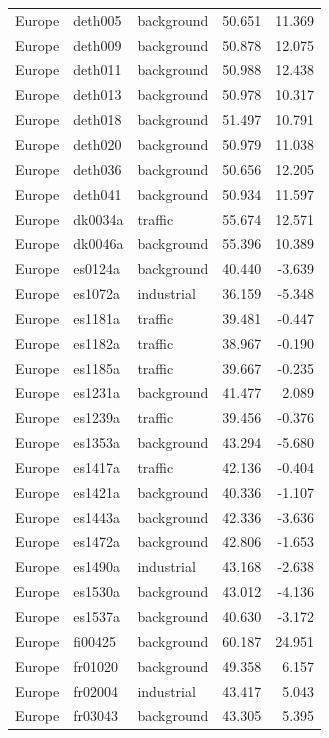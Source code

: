 \documentclass{article}
\begin{document}
\begin{longtable}{lllrr}
Europe & deth005 & background & 50.651 & 11.369 \\ 
Europe & deth009 & background & 50.878 & 12.075 \\ 
Europe & deth011 & background & 50.988 & 12.438 \\ 
Europe & deth013 & background & 50.978 & 10.317 \\ 
Europe & deth018 & background & 51.497 & 10.791 \\ 
Europe & deth020 & background & 50.979 & 11.038 \\ 
Europe & deth036 & background & 50.656 & 12.205 \\ 
Europe & deth041 & background & 50.934 & 11.597 \\ 
Europe & dk0034a & traffic & 55.674 & 12.571 \\ 
Europe & dk0046a & background & 55.396 & 10.389 \\ 
Europe & es0124a & background & 40.440 & -3.639 \\ 
Europe & es1072a & industrial & 36.159 & -5.348 \\ 
Europe & es1181a & traffic & 39.481 & -0.447 \\ 
Europe & es1182a & traffic & 38.967 & -0.190 \\ 
Europe & es1185a & traffic & 39.667 & -0.235 \\ 
Europe & es1231a & background & 41.477 & 2.089 \\ 
Europe & es1239a & traffic & 39.456 & -0.376 \\ 
Europe & es1353a & background & 43.294 & -5.680 \\ 
Europe & es1417a & traffic & 42.136 & -0.404 \\ 
Europe & es1421a & background & 40.336 & -1.107 \\ 
Europe & es1443a & background & 42.336 & -3.636 \\ 
Europe & es1472a & background & 42.806 & -1.653 \\ 
Europe & es1490a & industrial & 43.168 & -2.638 \\ 
Europe & es1530a & background & 43.012 & -4.136 \\ 
Europe & es1537a & background & 40.630 & -3.172 \\ 
Europe & fi00425 & background & 60.187 & 24.951 \\ 
Europe & fr01020 & background & 49.358 & 6.157 \\ 
Europe & fr02004 & industrial & 43.417 & 5.043 \\ 
Europe & fr03043 & background & 43.305 & 5.395 \\ 

\end{longtable}
\end{document}
